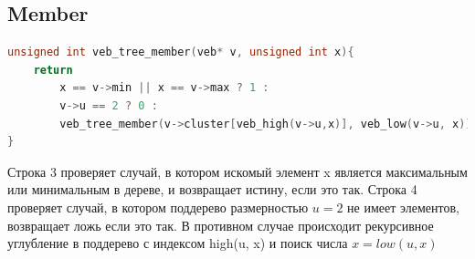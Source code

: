 \documentclass{article}
\begin{document}
\subsection{Member}
\begin{lstlisting}[language=C,style=C]
unsigned int veb_tree_member(veb* v, unsigned int x){
    return
        x == v->min || x == v->max ? 1 :
        v->u == 2 ? 0 :
        veb_tree_member(v->cluster[veb_high(v->u,x)], veb_low(v->u, x));
}
\end{lstlisting}
Строка 3 проверяет случай, в котором искомый элемент x является максимальным или минимальным в дереве, и возвращает истину, если это так. Строка 4 проверяет случай, в котором поддерево размерностью $u=2$ не имеет элементов, возвращает ложь если это так. В противном случае происходит рекурсивное углубление в поддерево с индексом high(u, x) и поиск числа $x = low(u, x)$
\end{document}
